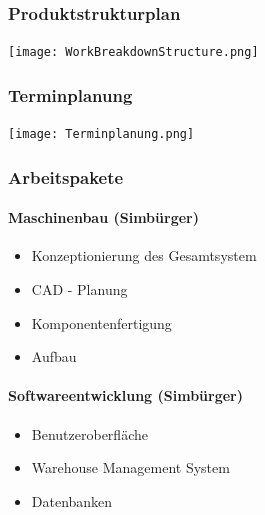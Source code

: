 \subsubsection{Produktstrukturplan}
\vspace{5mm}

\bgroup
    \centering
    \texttt{[image: WorkBreakdownStructure.png]}
\egroup

\newpage
\subsubsection{Terminplanung}
\vspace{5mm}

\bgroup
    \centering
    \texttt{[image: Terminplanung.png]}
\egroup

\newpage

\subsubsection{Arbeitspakete}

\paragraph{Maschinenbau (Simbürger)}
\begin{itemize}
    \item Konzeptionierung des Gesamtsystem
    \item CAD - Planung
    \item Komponentenfertigung
    \item Aufbau 
\end{itemize}

\paragraph{Softwareentwicklung (Simbürger)}
\begin{itemize}
    \item Benutzeroberfläche
    \item Warehouse Management System
    \item Datenbanken
\end{itemize}

